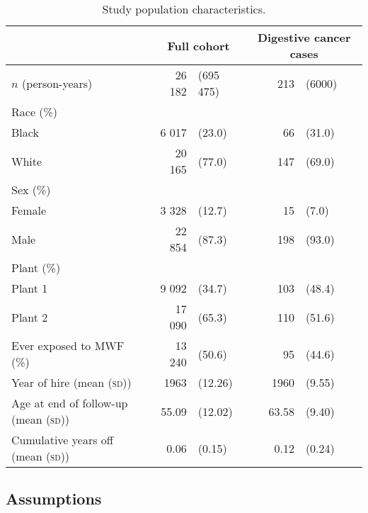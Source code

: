 \documentclass[
  11pt,
]{article}
\begin{document}
\begin{table}[h]
\caption{Study population characteristics.}
\label{tab:popchar}
\begin{center}\begin{tabular}{lrlrl}
\toprule
&       \multicolumn{2}{c}{Full cohort}       & \multicolumn{2}{c}{Digestive cancer cases}      \\
\midrule
$n$ (person-years) 
                       &     26 182 & (695 475) & 213 & (6000) \\ 
Race (\%) \\
\hspace{1.5em} Black   &      6 017 & (23.0)  &  66 & (31.0)  \\ 
\hspace{1.5em} White   &     20 165 & (77.0)  & 147 & (69.0)  \\ 
Sex (\%) \\
\hspace{1.5em} Female  &      3 328 & (12.7)  &  15 & (7.0)  \\ 
\hspace{1.5em} Male    &     22 854 & (87.3)  & 198 & (93.0)  \\ 
Plant (\%) \\
\hspace{1.5em} Plant 1 &      9 092 & (34.7)  & 103 & (48.4)  \\ 
\hspace{1.5em} Plant 2 &     17 090 & (65.3)  & 110 & (51.6)  \\ 
\midrule
Ever exposed to MWF (\%)
                                            &      13 240 & (50.6)  &  95 & (44.6)  \\ 
Year of hire (mean (\textsc{sd}))
                                            &            1963 & (12.26) & 1960 & (9.55) \\ 
Age at end of follow-up (mean (\textsc{sd}))
                                            &         55.09 & (12.02) & 63.58 & (9.40) \\ 
Cumulative years off (mean (\textsc{sd}))
                                            &          0.06 & (0.15)  & 0.12 & (0.24)   \\
\bottomrule
\end{tabular}\end{center}
\end{table}

\hypertarget{assumptions}{%
\subsection{Assumptions}\label{assumptions}}
\end{document}
